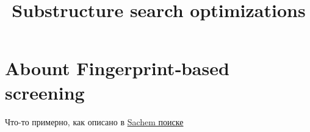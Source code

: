 \documentclass{article}
\title{Substructure search optimizations}
\begin{document}
\maketitle



\section{Abount Fingerprint‑based screening}

{\color{red} Что-то примерно, как описано в \href{https://jcheminf.biomedcentral.com/counter/pdf/10.1186/s13321-018-0282-y.pdf}{Sachem поиске}}




\end{document}
